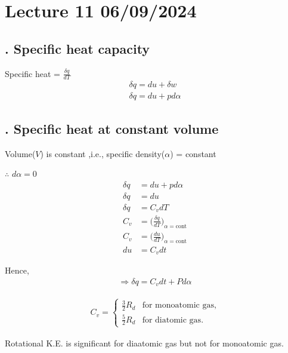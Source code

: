 \documentclass[fleqn,10pt]{SelfArx} %
\begin{document}
\clearpage

\section{Lecture 11 06/09/2024}

\subsection{. Specific heat capacity}
Specific heat = $\frac{\delta q}{dT}$
\begin{align}
    \delta q = du + \delta w \\ 
    \delta q = du + p d \alpha 
\end{align}

\subsection{. Specific heat at constant volume}
Volume($V$) is constant ,i.e., specific density($\alpha$) = constant 

$\therefore$ $d \alpha = 0$
\begin{align}
    \delta q &= du + p d\alpha \\
    \delta q &= du \\
    \delta q &= C_vdT \\
    C_v &= \Big(\frac{\delta q}{dT}\Big)_{\alpha =\text{cont}}\\
    C_v &= \Big(\frac{du}{dT}\Big)_{\alpha =\text{cont}}\\
    du &= C_vdt
\end{align}

Hence,
\begin{align}
   \Rightarrow \delta q = C_vdt + Pd\alpha     \label{eq:1st_law_with_const_volume}
\end{align}

\begin{align*}
C_v = 
    \begin{cases} 
        \frac{3}{2} R_d & \text{for monoatomic gas}, \\
        \frac{5}{2} R_d & \text{for diatomic gas}.
    \end{cases}
\end{align*}

Rotational K.E. is significant for diaatomic gas but not for monoatomic gas.
\end{document}

